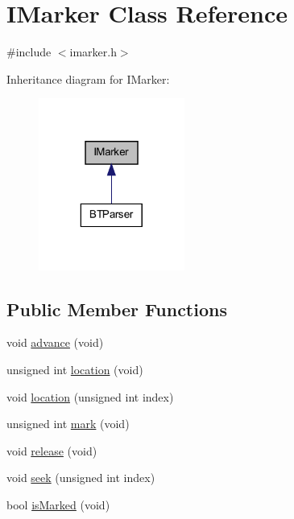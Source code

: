 \hypertarget{class_i_marker}{
\section{IMarker Class Reference}
\label{class_i_marker}
}


{\ttfamily \#include $<$imarker.h$>$}



Inheritance diagram for IMarker:
\nopagebreak
\begin{figure}[H]
\begin{center}
\leavevmode
\includegraphics[width=136pt]{class_i_marker__inherit__graph}
\end{center}
\end{figure}
\subsection*{Public Member Functions}
\begin{DoxyCompactItemize}
\item 
void \hyperlink{class_i_marker_a68c539e79c3052ba7addf090dfd05985}{advance} (void)
\item 
unsigned int \hyperlink{class_i_marker_a0e9628e8c66b493ff331abab55c744da}{location} (void)
\item 
void \hyperlink{class_i_marker_ac2d7a0e8bbfb213378f7a19b50ec9686}{location} (unsigned int index)
\item 
unsigned int \hyperlink{class_i_marker_a92024922612faa5bb0106609f151c050}{mark} (void)
\item 
void \hyperlink{class_i_marker_afce4bb0bef01b4579db97e1ca5e64001}{release} (void)
\item 
void \hyperlink{class_i_marker_a58086bbf091c5b49c15464a070fec171}{seek} (unsigned int index)
\item 
bool \hyperlink{class_i_marker_ae6fda228fa071a9720e7d2309d47ac6e}{isMarked} (void)
\end{DoxyCompactItemize}
